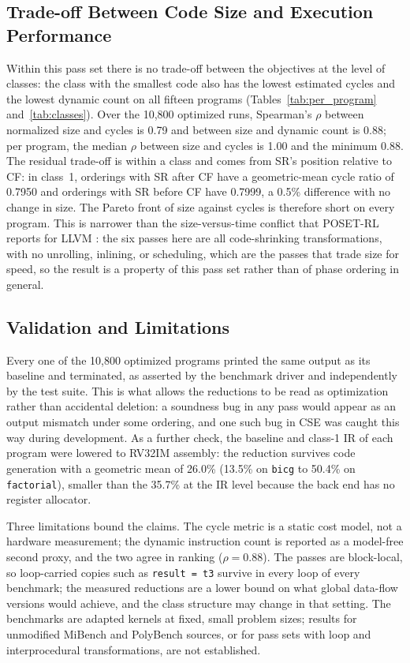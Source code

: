 \documentclass[conference]{IEEEtran}
\begin{document}
\subsection{Trade-off Between Code Size and Execution Performance}
\label{sec:tradeoff}
Within this pass set there is no trade-off between the objectives at the level of classes: the class with the smallest code also has the lowest estimated cycles and the lowest dynamic count on all fifteen programs (Tables~\ref{tab:per_program} and~\ref{tab:classes}). Over the 10,800 optimized runs, Spearman's $\rho$ between normalized size and cycles is 0.79 and between size and dynamic count is 0.88; per program, the median $\rho$ between size and cycles is 1.00 and the minimum 0.88. The residual trade-off is within a class and comes from SR's position relative to CF: in class~1, orderings with SR after CF have a geometric-mean cycle ratio of 0.7950 and orderings with SR before CF have 0.7999, a 0.5\% difference with no change in size. The Pareto front of size against cycles is therefore short on every program. This is narrower than the size-versus-time conflict that POSET-RL reports for LLVM \cite{ref8}: the six passes here are all code-shrinking transformations, with no unrolling, inlining, or scheduling, which are the passes that trade size for speed, so the result is a property of this pass set rather than of phase ordering in general.

\subsection{Validation and Limitations}
\label{sec:validation}
Every one of the 10,800 optimized programs printed the same output as its baseline and terminated, as asserted by the benchmark driver and independently by the test suite. This is what allows the reductions to be read as optimization rather than accidental deletion: a soundness bug in any pass would appear as an output mismatch under some ordering, and one such bug in CSE was caught this way during development. As a further check, the baseline and class-1 IR of each program were lowered to RV32IM assembly: the reduction survives code generation with a geometric mean of 26.0\% (13.5\% on \texttt{bicg} to 50.4\% on \texttt{factorial}), smaller than the 35.7\% at the IR level because the back end has no register allocator.

Three limitations bound the claims. The cycle metric is a static cost model, not a hardware measurement; the dynamic instruction count is reported as a model-free second proxy, and the two agree in ranking ($\rho = 0.88$). The passes are block-local, so loop-carried copies such as \texttt{result = t3} survive in every loop of every benchmark; the measured reductions are a lower bound on what global data-flow versions would achieve, and the class structure may change in that setting. The benchmarks are adapted kernels at fixed, small problem sizes; results for unmodified MiBench and PolyBench sources, or for pass sets with loop and interprocedural transformations, are not established.
\end{document}
